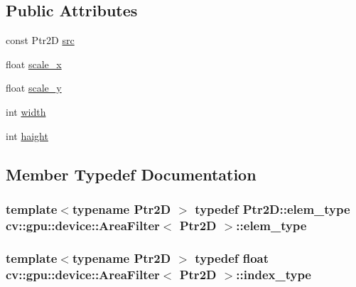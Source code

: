 \subsection*{Public Attributes}
\begin{DoxyCompactItemize}
\item 
const Ptr2\-D \hyperlink{structcv_1_1gpu_1_1device_1_1AreaFilter_a94770fe941fc982b70005b0f6d5f618b}{src}
\item 
float \hyperlink{structcv_1_1gpu_1_1device_1_1AreaFilter_ac0929ca79683b94cb33da45d7aba46ec}{scale\-\_\-x}
\item 
float \hyperlink{structcv_1_1gpu_1_1device_1_1AreaFilter_ae7c124ce676b8620fb4de473ff83d7f6}{scale\-\_\-y}
\item 
int \hyperlink{structcv_1_1gpu_1_1device_1_1AreaFilter_adabbae34534014ec806f3459a6372d21}{width}
\item 
int \hyperlink{structcv_1_1gpu_1_1device_1_1AreaFilter_a90e76ee923cf87a08e54847f12eaf089}{haight}
\end{DoxyCompactItemize}


\subsection{Member Typedef Documentation}
\hypertarget{structcv_1_1gpu_1_1device_1_1AreaFilter_afa9613c18da7af95c4efcfebce21595f}{
\subsubsection[{elem\-\_\-type}]{\setlength{\rightskip}{0pt plus 5cm}template$<$typename Ptr2\-D $>$ typedef Ptr2\-D\-::elem\-\_\-type {\bf cv\-::gpu\-::device\-::\-Area\-Filter}$<$ Ptr2\-D $>$\-::{\bf elem\-\_\-type}}}\label{structcv_1_1gpu_1_1device_1_1AreaFilter_afa9613c18da7af95c4efcfebce21595f}
\hypertarget{structcv_1_1gpu_1_1device_1_1AreaFilter_a07abcdbb315d9e6ce77a17ec793591ea}{
\subsubsection[{index\-\_\-type}]{\setlength{\rightskip}{0pt plus 5cm}template$<$typename Ptr2\-D $>$ typedef float {\bf cv\-::gpu\-::device\-::\-Area\-Filter}$<$ Ptr2\-D $>$\-::{\bf index\-\_\-type}}}\label{structcv_1_1gpu_1_1device_1_1AreaFilter_a07abcdbb315d9e6ce77a17ec793591ea}


